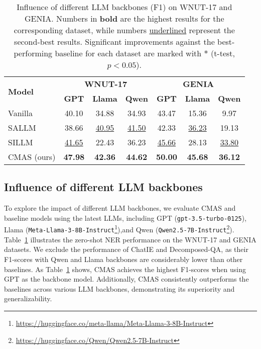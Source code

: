 \begin{table}[ht]
	\centering
        \setlength\tabcolsep{3pt}
 	\caption{Influence of different \ac{LLM} backbones (F1) on WNUT-17 and GENIA. Numbers in \textbf{bold} are the highest results for the corresponding dataset, while numbers \underline{underlined} represent the second-best results. Significant improvements against the best-performing baseline for each dataset are marked with $\ast$ (t-test, $p < 0.05$).}
	\begin{tabular}{l c c c c c c}
		\toprule
		\multirow{2}{*}{\textbf{Model}} & \multicolumn{3}{c}{\textbf{WNUT-17}} & \multicolumn{3}{c}{\textbf{GENIA}} \\
  \cmidrule(r){2-4}
  \cmidrule(r){5-7}
		 & \bf GPT & \bf Llama & \bf Qwen & \bf GPT & \bf Llama & \bf Qwen \\ 
        \midrule
		Vanilla~\citep{DBLP:conf/emnlp/XieLZZLW23,DBLP:journals/corr/abs-2311-08921} & 40.10 & 34.88 & 34.93 & 43.47 & 15.36 &  \phantom{0}9.97   \\ 
		SALLM~\citep{DBLP:conf/emnlp/XieLZZLW23} & 38.66 & \underline{40.95} & \underline{41.50} & 42.33 & \underline{36.23} & 19.13   \\ 
		SILLM~\citep{DBLP:journals/corr/abs-2311-08921} & \underline{41.65} & 22.43 & 36.23 & \underline{45.66} & 28.13 & \underline{33.80}   \\ 
        \midrule
		CMAS (ours) & \textbf{47.98}\rlap{$^{\ast}$} & \textbf{42.36}\rlap{$^{\ast}$} & \textbf{44.62}\rlap{$^{\ast}$} & \textbf{50.00}\rlap{$^{\ast}$} & \textbf{45.68}\rlap{$^{\ast}$} & \textbf{36.12}\rlap{$^{\ast}$} \\ \bottomrule
	\end{tabular}
	\label{tab:other LLMs}
\end{table}




\subsection{Influence of different LLM backbones}
\label{subsec:LLM backbones}
To explore the impact of different \ac{LLM} backbones, we evaluate \ac{CMAS} and baseline models using the latest \acp{LLM}, including GPT (\texttt{gpt-3.5-turbo-0125}), Llama (\texttt{Meta-Llama-3-8B-Instruct}\footnote{\url{https://huggingface.co/meta-llama/Meta-Llama-3-8B-Instruct}}),\linebreak and Qwen (\texttt{Qwen2.5-7B-Instruct}\footnote{\url{https://huggingface.co/Qwen/Qwen2.5-7B-Instruct}}). Table~\ref{tab:other LLMs} illustrates the zero-shot \ac{NER} performance on the WNUT-17 and GENIA datasets. We exclude the performance of ChatIE and Decomposed-QA, as their F1-scores with Qwen and Llama backbones are considerably lower than other baselines. As Table~\ref{tab:other LLMs} shows, \ac{CMAS} achieves the highest F1-scores when using GPT as the backbone model. Additionally, CMAS consistently outperforms the baselines across various LLM backbones, demonstrating its superiority and generalizability.

